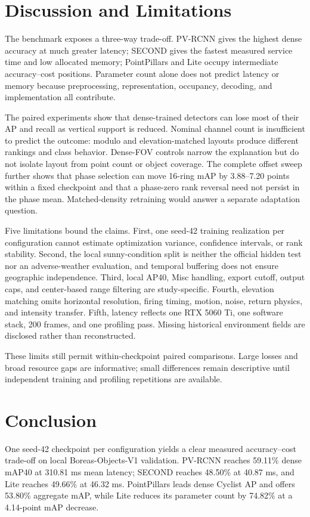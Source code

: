 \documentclass[10pt,twocolumn]{article}
\begin{document}
\section{Discussion and Limitations}
The benchmark exposes a three-way trade-off. PV-RCNN gives the highest dense accuracy at much greater latency; SECOND gives the fastest measured service time and low allocated memory; PointPillars and Lite occupy intermediate accuracy--cost positions. Parameter count alone does not predict latency or memory because preprocessing, representation, occupancy, decoding, and implementation all contribute.

The paired experiments show that dense-trained detectors can lose most of their AP and recall as vertical support is reduced. Nominal channel count is insufficient to predict the outcome: modulo and elevation-matched layouts produce different rankings and class behavior. Dense-FOV controls narrow the explanation but do not isolate layout from point count or object coverage. The complete offset sweep further shows that phase selection can move 16-ring mAP by 3.88--7.20 points within a fixed checkpoint and that a phase-zero rank reversal need not persist in the phase mean. Matched-density retraining would answer a separate adaptation question.

Five limitations bound the claims. First, one seed-42 training realization per configuration cannot estimate optimization variance, confidence intervals, or rank stability. Second, the local sunny-condition split is neither the official hidden test nor an adverse-weather evaluation, and temporal buffering does not ensure geographic independence. Third, local AP40, Misc handling, export cutoff, output caps, and center-based range filtering are study-specific. Fourth, elevation matching omits horizontal resolution, firing timing, motion, noise, return physics, and intensity transfer. Fifth, latency reflects one RTX 5060 Ti, one software stack, 200 frames, and one profiling pass. Missing historical environment fields are disclosed rather than reconstructed.

These limits still permit within-checkpoint paired comparisons. Large losses and broad resource gaps are informative; small differences remain descriptive until independent training and profiling repetitions are available.

\section{Conclusion}
One seed-42 checkpoint per configuration yields a clear measured accuracy--cost trade-off on local Boreas-Objects-V1 validation. PV-RCNN reaches 59.11\% dense mAP40 at 310.81 ms mean latency; SECOND reaches 48.50\% at 40.87 ms, and Lite reaches 49.66\% at 46.32 ms. PointPillars leads dense Cyclist AP and offers 53.80\% aggregate mAP, while Lite reduces its parameter count by 74.82\% at a 4.14-point mAP decrease.
\end{document}
